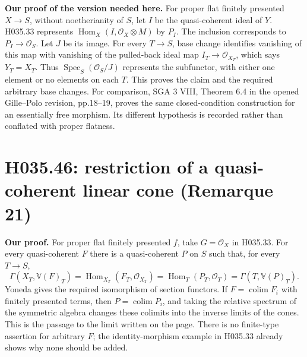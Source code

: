 \textbf{Our proof of the version needed here.} For proper flat
finitely presented $X\to S$, without noetherianity of $S$,
let $I$ be the quasi-coherent ideal of $Y$. H035.33 represents
$\operatorname{Hom}_X(I,\mathcal O_X\otimes M)$ by $P_I$.
The inclusion corresponds to $P_I\to\mathcal O_S$. Let $J$
be its image. For every $T\to S$, base change identifies
vanishing of this map with vanishing of the pulled-back ideal
map $I_T\to\mathcal O_{X_T}$, which says $Y_T=X_T$.
Thus $\operatorname{Spec}_S(\mathcal O_S/J)$ represents the
subfunctor, with either one element or no elements on each $T$.
This proves the claim and the required arbitrary base changes.
For comparison, SGA 3 VIII, Theorem 6.4 in the opened
Gille--Polo revision, pp.18--19, proves the same closed-condition
construction for an essentially free morphism. Its different
hypothesis is recorded rather than conflated with proper flatness.

\section{H035.46: restriction of a quasi-coherent linear cone (Remarque 21)}
\textbf{Our proof.} For proper flat finitely presented $f$, take
$G=\mathcal O_X$ in H035.33. For every quasi-coherent $F$ there
is a quasi-coherent $P$ on $S$ such that, for every $T\to S$,
\[
 \Gamma(X_T,\mathbb V(F)_T)
 =\operatorname{Hom}_{X_T}(F_T,\mathcal O_{X_T})
 =\operatorname{Hom}_T(P_T,\mathcal O_T)
 =\Gamma(T,\mathbb V(P)_T).
\]
Yoneda gives the required isomorphism of section functors.
If $F=\operatorname{colim}F_i$ with finitely presented terms,
then $P=\operatorname{colim}P_i$, and taking the relative
spectrum of the symmetric algebra changes these colimits into
the inverse limits of the cones. This is the passage to the
limit written on the page. There is no finite-type assertion
for arbitrary $F$; the identity-morphism example in H035.33
already shows why none should be added.
